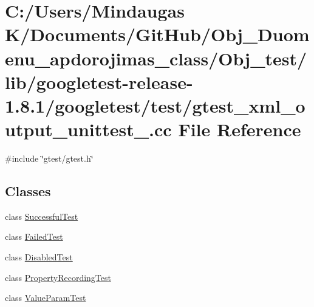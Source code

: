 \hypertarget{_obj__test_2lib_2googletest-release-1_88_81_2googletest_2test_2gtest__xml__output__unittest___8cc}{}\section{C\+:/\+Users/\+Mindaugas K/\+Documents/\+Git\+Hub/\+Obj\+\_\+\+Duomenu\+\_\+apdorojimas\+\_\+class/\+Obj\+\_\+test/lib/googletest-\/release-\/1.8.1/googletest/test/gtest\+\_\+xml\+\_\+output\+\_\+unittest\+\_\+.cc File Reference}
\label{_obj__test_2lib_2googletest-release-1_88_81_2googletest_2test_2gtest__xml__output__unittest___8cc}
{\ttfamily \#include \char`\"{}gtest/gtest.\+h\char`\"{}}\newline
\subsection*{Classes}
\begin{DoxyCompactItemize}
\item 
class \mbox{\hyperlink{class_successful_test}{Successful\+Test}}
\item 
class \mbox{\hyperlink{class_failed_test}{Failed\+Test}}
\item 
class \mbox{\hyperlink{class_disabled_test}{Disabled\+Test}}
\item 
class \mbox{\hyperlink{class_property_recording_test}{Property\+Recording\+Test}}
\item 
class \mbox{\hyperlink{class_value_param_test}{Value\+Param\+Test}}
\end{DoxyCompactItemize}
